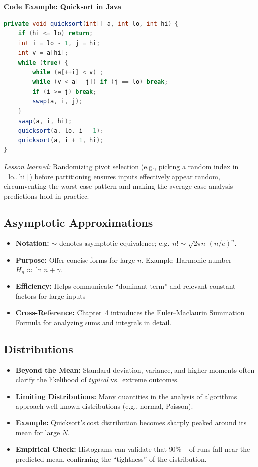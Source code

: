 \documentclass[11pt,letterpaper]{article}
\begin{document}
\noindent
\textbf{Code Example: Quicksort in Java}
\label{quicksort-prog}
\begin{lstlisting}[language=Java]
private void quicksort(int[] a, int lo, int hi) {
    if (hi <= lo) return;
    int i = lo - 1, j = hi;
    int v = a[hi];
    while (true) {
        while (a[++i] < v) ;        
        while (v < a[--j]) if (j == lo) break;
        if (i >= j) break;
        swap(a, i, j);
    }
    swap(a, i, hi);
    quicksort(a, lo, i - 1);
    quicksort(a, i + 1, hi);
}
\end{lstlisting}

\noindent
\emph{Lesson learned:} Randomizing pivot selection (e.g., picking a random index in \([\text{lo}..\,\text{hi}]\)) before partitioning ensures inputs effectively appear random, circumventing the worst-case pattern and making the average-case analysis predictions hold in practice.

\subsection{Asymptotic Approximations}

\begin{itemize}
  \item \textbf{Notation:} \(\sim\) denotes asymptotic equivalence; e.g.\ \(n!\sim \sqrt{2\pi n}\,(n/e)^n\).
  \item \textbf{Purpose:} Offer concise forms for large \(n\). Example: Harmonic number \(H_n \approx \ln n + \gamma\).
  \item \textbf{Efficiency:} Helps communicate “dominant term” and relevant constant factors for large inputs.
  \item \textbf{Cross-Reference:} Chapter~4 introduces the Euler--Maclaurin Summation Formula for analyzing sums and integrals in detail.
\end{itemize}

\subsection{Distributions}

\begin{itemize}
  \item \textbf{Beyond the Mean:} Standard deviation, variance, and higher moments often clarify the likelihood of \emph{typical} vs.\ extreme outcomes.
  \item \textbf{Limiting Distributions:} Many quantities in the analysis of algorithms approach well-known distributions (e.g., normal, Poisson).
  \item \textbf{Example:} Quicksort’s cost distribution becomes sharply peaked around its mean for large \(N\).
  \item \textbf{Empirical Check:} Histograms can validate that 90\%+ of runs fall near the predicted mean, confirming the “tightness” of the distribution.
\end{itemize}
\end{document}
